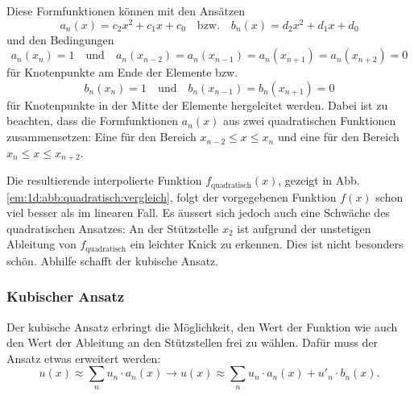 Diese Formfunktionen können mit den Ansätzen 
\begin{equation}
    a_n(x) = c_2x^2 + c_1x + c_0
    \quad \text{bzw.} \quad
    b_n(x) = d_2x^2 + d_1x + d_0
\end{equation}
und den Bedingungen 
\begin{equation}
    a_n(x_n) = 1 
    \quad \text{und} \quad 
    a_n(x_{n-2}) = a_n(x_{n-1}) = a_n(x_{n+1}) = a_n(x_{n+2}) = 0
\end{equation}
für Knotenpunkte am Ende der Elemente bzw.
\begin{equation}
    b_n(x_n) = 1
    \quad \text{und} \quad 
    b_n(x_{n-1}) = b_n(x_{n+1}) = 0
\end{equation}
für Knotenpunkte in der Mitte der Elemente hergeleitet werden.
Dabei ist zu beachten, dass die Formfunktionen $a_n(x)$ aus zwei quadratischen Funktionen zusammensetzen: 
Eine für den Bereich $x_{n-2} \leq x \leq x_n$ und eine für den Bereich $x_n \leq x \leq x_{n+2}$.

Die resultierende interpolierte Funktion $f_\text{quadratisch} (x)$, gezeigt in Abb. \ref{em:1d:abb:quadratisch:vergleich}, folgt der vorgegebenen Funktion $f(x)$ schon viel besser als im linearen Fall.
Es äussert sich jedoch auch eine Schwäche des quadratischen Ansatzes: 
An der Stützstelle $x_2$ ist aufgrund der unstetigen Ableitung von $f_\text{quadratisch}$ ein leichter Knick zu erkennen.
Dies ist nicht besonders schön.
Abhilfe schafft der kubische Ansatz.

\subsubsection{Kubischer Ansatz}

Der kubische Ansatz erbringt die Möglichkeit, den Wert der Funktion wie auch den Wert der Ableitung an den Stützstellen frei zu wählen.
Dafür muss der Ansatz etwas erweitert werden:
\begin{equation}
    u(x) \approx \sum_{n}{u_n \cdot a_n(x)} \rightarrow u(x) \approx \sum_{n}{u_n \cdot a_n(x) + u'_n \cdot b_n(x)}.
\end{equation}

